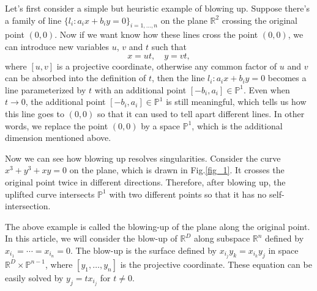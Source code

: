 \documentclass[12pt]{article}
\theoremstyle{definition}
\theoremstyle{plain}
\begin{document}
Let's first consider a simple but heuristic example of blowing up. 
Suppose there's a family of line $\{l_i: a_ix+b_iy=0\}_{i=1,\dots,n}$ on the plane 
$\mathbb R^2$
crossing the original point $(0,0)$. 
Now if we want know how these lines cross the point $(0,0)$, we can introduce 
new variables $u$, $v$ and $t$ such that
\[
	x=ut,\quad y=vt,
\] 
where $[u,v]$ is a projective coordinate, otherwise any common factor of $u$ and $v$ can be 
absorbed into the definition of $t$, then the line $l_i:a_ix+b_iy=0$ becomes a line parameterized 
by $t$ with an additional point $[-b_i,a_i]\in \mathbb P^1$. Even when $t\to 0$, the additional point
$[-b_i,a_i]\in \mathbb P^1$ is still meaningful, which tells us how this line goes to $(0,0)$
so that it can used to tell apart different lines.
In other words, we replace the point $(0,0)$ by a space $\mathbb P^1$, which is the additional
dimension mentioned above. 

Now we can see how blowing up resolves singularities. 
Consider the curve $x^3+y^3+xy=0$ on the plane, which is drawn in Fig.\ref{fig_1}.
It crosses the original point twice in different 
directions. Therefore, after blowing up, the uplifted curve intersects $\mathbb P^1$ with two 
different points so that it has no self-intersection. 

The above example is called the blowing-up of the plane along the original point.
In this article, we will consider the blow-up of $\mathbb R^D$
along subspace $\mathbb R^n$ defined by $x_{i_1}=\cdots=x_{i_n}=0$. 
The blow-up is the surface defined by $x_{i_j}y_k=x_{i_k}y_j$ in space 
$\mathbb R^{D}\times \mathbb P^{n-1}$,
where $[y_1,\dots,y_n]$ is the projective coordinate. These equation can be easily
solved by $y_j=tx_{i_j}$ for $t\neq 0$.

\end{document}
